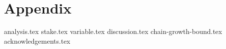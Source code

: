 \pagebreak
\section*{Appendix}

{analysis.tex}
{stake.tex}
{variable.tex}
{discussion.tex}
{chain-growth-bound.tex}
\ifanonymous\else
{acknowledgements.tex}
\fi
